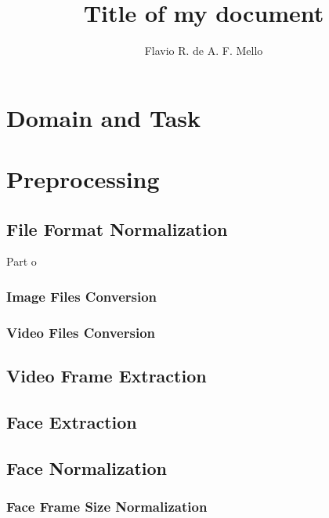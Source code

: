 \documentclass[11pt]{article}
\title{Title of my document}
\author{Flavio R. de A. F. Mello}
\begin{document}
\maketitle

\section{Domain and Task}



\section{Preprocessing}

\subsection{File Format Normalization}
Part o
\subsubsection{Image Files Conversion}

\subsubsection{Video Files Conversion}

\subsection{Video Frame Extraction}

\subsection{Face Extraction}

\subsection{Face Normalization}
\subsubsection{Face Frame Size Normalization}
\end{document}
